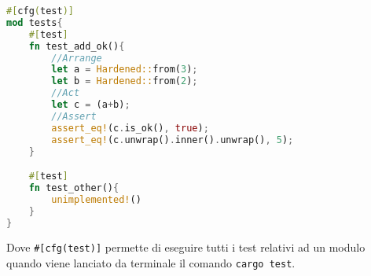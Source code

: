 \begin{lstlisting}[language=rust, style=boxed]
#[cfg(test)]
mod tests{
    #[test]
    fn test_add_ok(){
        //Arrange
        let a = Hardened::from(3);
        let b = Hardened::from(2);
        //Act
        let c = (a+b);
        //Assert
        assert_eq!(c.is_ok(), true);
        assert_eq!(c.unwrap().inner().unwrap(), 5);
    }

    #[test]
    fn test_other(){
        unimplemented!()
    }
}
\end{lstlisting}
Dove \texttt{\#[cfg(test)]} permette di eseguire tutti i test relativi ad un modulo quando viene lanciato da terminale il comando \texttt{cargo test}.